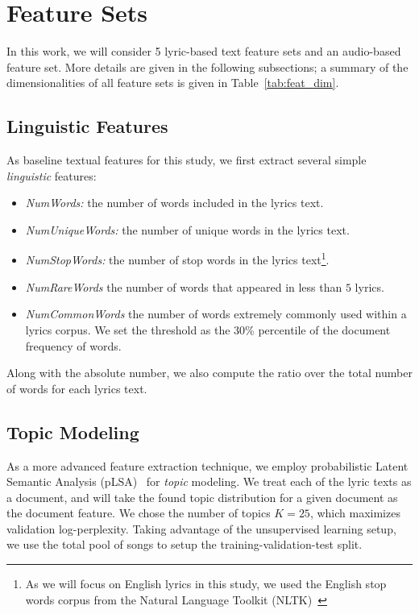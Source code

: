 \documentclass{article}
\begin{document}





\section{Feature Sets}\label{sec:featset}

In this work, we will consider 5 lyric-based text feature sets and an audio-based feature set. More details are given in the following subsections; a summary of the dimensionalities of all feature sets is given in Table~\ref{tab:feat_dim}.

\subsection{Linguistic Features}\label{sec:featset:lingfeat}
As baseline textual features for this study, we first extract several simple \emph{linguistic} features:

\begin{itemize}
    \itemsep0em 
    \item \emph{NumWords:} the number of words included in the lyrics text.
    \item \emph{NumUniqueWords:} the number of  unique words in the lyrics text.
    \item \emph{NumStopWords:} the number of stop words in the lyrics text\footnote{As we will focus on English lyrics in this study, we used the English stop words corpus from the Natural Language Toolkit (NLTK)~\cite{DBLP:books/daglib/0022921}}.
    \item \emph{NumRareWords} the number of words that appeared in less than $5$ lyrics.
    \item \emph{NumCommonWords} the number of  words extremely commonly used within a lyrics corpus. We set the threshold as the 30\% percentile of the document frequency of words.
\end{itemize}

Along with the absolute number, we also compute the ratio over the total number of words for each lyrics text. 

\subsection{Topic Modeling}\label{sec:featset:topic}

As a more advanced feature extraction technique, we employ probabilistic Latent Semantic Analysis (pLSA)~\cite{DBLP:journals/ml/Hofmann01} for \emph{topic} modeling. We treat each of the lyric texts as a document, and will take the found topic distribution for a given document as the document feature. We chose the number of topics $K=25$, which maximizes validation log-perplexity. Taking advantage of the unsupervised learning setup, we use the total pool of songs to setup the training-validation-test split.
\end{document}
